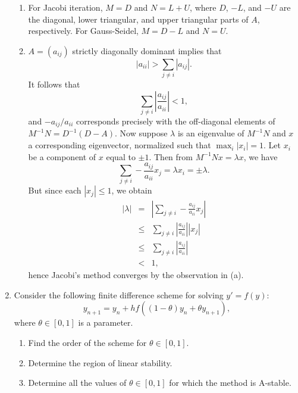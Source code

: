 \documentclass{article}
\begin{document}
\begin{enumerate}
\begin{enumerate}
\item For Jacobi iteration, \(M = D\) and \(N = L + U\), where \(D\), \(-L\), and \(-U\) are the diagonal, lower triangular, and upper triangular parts of \(A\), respectively.  For Gauss-Seidel, \(M = D - L\) and \(N = U\).

\item \(A = (a_{ij})\) strictly diagonally dominant implies that
\[|a_{ii}| > \sum_{j \neq i} |a_{ij}|.\]
It follows that
\[\sum_{j \neq i} \left| \frac{a_{ij}}{a_{ii}} \right| < 1,\]
and \(-a_{ij}/a_{ii}\) corresponds precisely with the off-diagonal elements of \(M^{-1}N = D^{-1}(D - A)\).  Now suppose \(\lambda\) is an eigenvalue of \(M^{-1}N\) and \(x\) a corresponding eigenvector, normalized such that \(\max_i |x_i| = 1\).  Let \(x_i\) be a component of \(x\) equal to \(\pm1\).  Then from \(M^{-1}Nx = \lambda x\), we have
\[\sum_{j \neq i} -\frac{a_{ij}}{a_{ii}} x_j = \lambda x_i = \pm\lambda.\]
But since each \(|x_j| \leq 1\), we obtain
\begin{eqnarray*}
|\lambda| &   =  & \left| \sum_{j \neq i} -\frac{a_{ij}}{a_{ii}} x_j \right| \\
          & \leq & \sum_{j \neq i} \left| \frac{a_{ij}}{a_{ii}} \right| |x_j| \\
          & \leq & \sum_{j \neq i} \left| \frac{a_{ij}}{a_{ii}} \right| \\
          &   <  & 1,
\end{eqnarray*}
hence Jacobi's method converges by the observation in (a).

\end{enumerate}



\item Consider the following finite difference scheme for solving \(y' = f(y)\):
\[y_{n + 1} = y_n + h f \left( (1 - \theta) y_n + \theta y_{n + 1} \right),\]
where \(\theta \in [0,1]\) is a parameter.

\begin{enumerate}
\item Find the order of the scheme for \(\theta \in [0,1]\).

\item Determine the region of linear stability.

\item Determine all the values of \(\theta \in [0,1]\) for which the method is A-stable.

\end{enumerate}


\end{enumerate}
\end{document}
